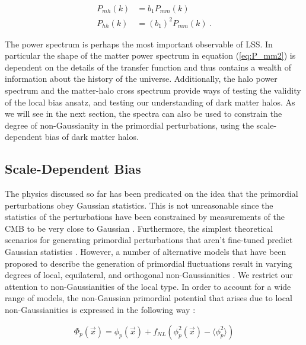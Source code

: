 \documentclass[10pt,letterpaper,final]{iopart}
\numberwithin{equation}{subsection}
\def\ni{\noindent}
\begin{document}
\begin{align}
\label{eq:Pmh_bias}P_{mh}(k) &= b_1 P_{mm}(k) \\
\label{eq:Phh_bias}P_{hh}(k) &= (b_1)^2 P_{mm}(k) \ . 
\end{align}

\ni The power spectrum is perhaps the most important observable of LSS. In particular the shape of the matter power spectrum in equation (\ref{eq:P_mm2}) is dependent on the details of the transfer function and thus contains a wealth of information about the history of the universe. Additionally, the halo power spectrum and the matter-halo cross spectrum provide ways of testing the validity of the local bias ansatz, and testing our understanding of dark matter halos. As we will see in the next section, the spectra can also be used to constrain the degree of non-Gaussianity in the primordial perturbations, using the scale-dependent bias of dark matter halos.




%


\subsection{Scale-Dependent Bias}\label{sec:scalebias}

The physics discussed so far has been predicated on the idea that the primordial perturbations obey Gaussian statistics. This is not unreasonable since the statistics of the perturbations have been constrained by measurements of the CMB to be very close to Gaussian \cite{PlanckNG}. Furthermore, the simplest theoretical scenarios for generating primordial perturbations that aren't fine-tuned predict Gaussian statistics \cite{Dodelson}\cite{Baumann}. However, a number of alternative models that have been proposed to describe the generation of primordial fluctuations result in varying degrees of local, equilateral, and orthogonal non-Gaussianities \cite{Dalal}. We restrict our attention to non-Gaussianities of the local type. In order to account for a wide range of models, the non-Gaussian primordial potential that arises due to local non-Gaussianities is expressed in the following way \cite{Dalal}\cite{NG1}\cite{NG2}\cite{NG3}\cite{NG4}\cite{NG5}\cite{NG6} :

\begin{equation}\label{eq:phiNG}
\Phi_p(\vec{x}) = \phi_p(\vec{x}) + f_{NL}(\phi_p^2(\vec{x}) - \langle \phi_p^2 \rangle)
\end{equation}
\end{document}
